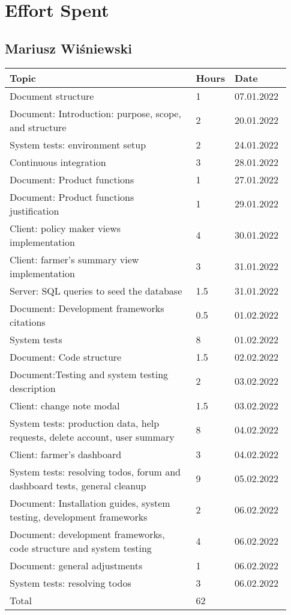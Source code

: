 \chapter{Effort Spent}

\section*{Mariusz Wiśniewski}
\begin{longtable}{@{}p{0.67\linewidth} p{0.06\linewidth} p{0.20\linewidth}@{}}
    \toprule[1.5pt]
    Topic & Hours & Date\\ \hline
    Document structure & 1 & 07.01.2022\\ 
    Document: Introduction: purpose, scope, and structure & 2 & 20.01.2022\\
    System tests: environment setup & 2 & 24.01.2022\\
    Continuous integration & 3 & 28.01.2022\\
    Document: Product functions & 1 & 27.01.2022\\
    Document: Product functions justification & 1 & 29.01.2022\\
    Client: policy maker views implementation & 4 & 30.01.2022\\
    Client: farmer's summary view implementation & 3 & 31.01.2022\\
    Server: SQL queries to seed the database & 1.5 & 31.01.2022\\
    Document: Development frameworks citations & 0.5 & 01.02.2022\\
    System tests & 8 & 01.02.2022\\
    Document: Code structure & 1.5 & 02.02.2022\\
    Document:Testing and system testing description & 2 & 03.02.2022\\
    Client: change note modal & 1.5 & 03.02.2022\\
    System tests: production data, help requests, delete account, user summary & 8 & 04.02.2022\\
    Client: farmer's dashboard & 3 & 04.02.2022\\
    System tests: resolving todos, forum and dashboard tests, general cleanup & 9 & 05.02.2022\\
    Document: Installation guides, system testing, development frameworks & 2 & 06.02.2022\\
    Document: development frameworks, code structure and system testing & 4 & 06.02.2022\\ 
    Document: general adjustments & 1 & 06.02.2022\\
    System tests: resolving todos & 3 & 06.02.2022\\
    \hline
    Total & 62 &\\ 
    \bottomrule[1.5pt]
\end{longtable}

